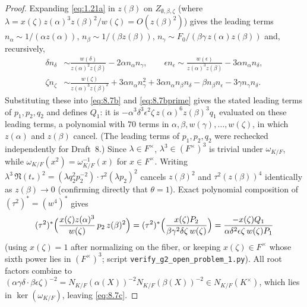 \documentclass[12pt,letterpaper]{amsart}
\theoremstyle{plain}
\theoremstyle{definition}
\theoremstyle{remark}
\theoremstyle{definition}
\begin{document}
\begin{proof}
Expanding \eqref{eq:1.21a} in $z(\beta)$ on $Z_{\emptyset,\beta,\zeta}$ (where
$\lambda=x(\zeta)z(\alpha)^3z(\beta)^2/w(\zeta)=O(z(\beta)^2)$) gives the
leading terms
$n_\alpha\sim1/(\alpha z(\alpha))$, $n_\beta\sim1/(\beta z(\beta))$,
$n_\gamma\sim F_0/(\beta\gamma\,z(\alpha)z(\beta))$ and, recursively,
\[
\begin{split}
\delta n_\delta&\sim\frac{w(\delta)}{z(\alpha)^2z(\beta)}-2\alpha n_\alpha n_\gamma,\qquad
\epsilon n_\epsilon\sim\frac{w(\epsilon)}{z(\alpha)^3z(\beta)}-3\alpha n_\alpha n_\delta,\\
\zeta n_\zeta&\sim\frac{w(\zeta)}{z(\alpha)^3z(\beta)^2}+3\alpha n_\alpha n_\gamma^2
+3\alpha n_\alpha n_\beta n_\delta-\beta n_\beta n_\epsilon-3\gamma n_\gamma n_\delta .
\end{split}
\]
Substituting these into \eqref{eq:8.7b} and \eqref{eq:8.7bprime} gives the
stated leading terms of $p_1,p_2,q_2$ and defines $Q_1$: it is
$-\alpha^3\delta^3\epsilon^2\zeta\,z(\alpha)^6z(\beta)^3q_1$ evaluated on these
leading terms, a polynomial with $70$ terms in $\alpha,\beta,w(\gamma),\dots,
w(\zeta)$, in which $z(\alpha)$ and $z(\beta)$ cancel. (The leading terms of
$p_1,p_2,q_2$ were rechecked independently for Draft~8.) Since $\lambda\in F^\times$, $\lambda^3\in(F^\times)^3$
is trivial under $\omega_{K/F}$, while $\omega_{K/F}(x^2)=\omega_{K/F}^{-1}(x)$ for
$x\in F^\times$. Writing
$\lambda^3\,\mathfrak N(t_*)^2=(\lambda q_2^2p_2^{-2})\cdot\tau^2(\lambda p_2)^2$ cancels
$z(\beta)^2$ and $\tau^2(z(\beta))^4$ identically as $z(\beta)\to 0$ (confirming
directly that $\theta=1$). Exact polynomial composition of $(\tau^2)^*=(w^4)^*$
gives
\[
(\tau^2)^*\Bigl(\frac{x(\zeta)z(\alpha)^3}{w(\zeta)}\,p_2\, z(\beta)^2\Bigr)
=(\tau^2)^*\Bigl(\frac{x(\zeta)P_2}{\beta\gamma^2\delta\zeta\,w(\zeta)}\Bigr)
=\frac{-x(\zeta)Q_1}{\alpha\delta^2\epsilon\zeta\,w(\zeta)P_1}
\]
(using
$x(\zeta)=1$ after normalizing on the fiber, or keeping $x(\zeta)\in F^\times$
whose sixth power lies in $(F^\times)^3$; script
\texttt{verify\_g2\_open\_problem\_1.py}). All root factors combine to
$(\alpha\gamma\delta\cdot\beta\epsilon\zeta)^{-2}=N_{K/F}(\alpha(X))^{-2}N_{K/F}(\beta(X))^{-2}\in N_{K/F}(K^\times)$,
which lies in $\ker(\omega_{K/F})$, leaving \eqref{eq:8.7c}.
\end{proof}
\end{document}
